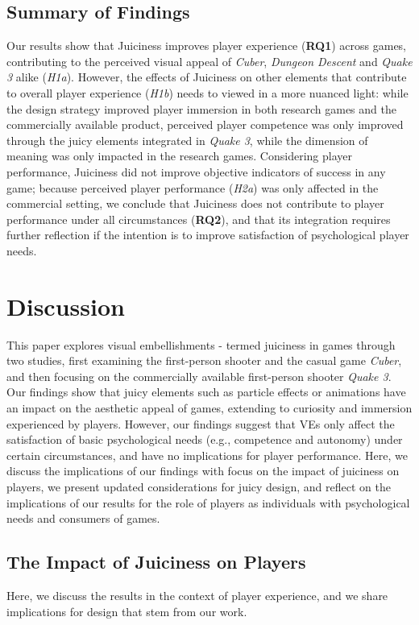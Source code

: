 \documentclass{sigchi}
\begin{document}
\subsection{Summary of Findings}
Our results show that Juiciness improves player experience (\textbf{RQ1}) across games, contributing to the perceived visual appeal of \textit{Cuber}, \textit{Dungeon Descent} and \textit{Quake 3} alike (\textit{H1a}). However, the effects of Juiciness on other elements that contribute to overall player experience (\textit{H1b}) needs to viewed in a more nuanced light: while the design strategy improved player immersion in both research games and the commercially available product, perceived player competence was only improved through the juicy elements integrated in \textit{Quake 3}, while the dimension of meaning was only impacted in the research games. Considering player performance, Juiciness did not improve objective indicators of success in any game; because perceived player performance (\textit{H2a}) was only affected in the commercial setting, we conclude that Juiciness does not contribute to player performance under all circumstances (\textbf{RQ2}), and that its integration requires further reflection if the intention is to improve satisfaction of psychological player needs.
\section{Discussion}
This paper explores visual embellishments - termed juiciness in games through two studies, first examining the first-person shooter  and the casual game \textit{Cuber}, and then focusing on the commercially available first-person shooter \textit{Quake 3}. Our findings show that juicy elements such as particle effects or animations have an impact on the aesthetic appeal of games, extending to curiosity and immersion experienced by players. However, our findings suggest that VEs only affect the satisfaction of basic psychological needs (e.g., competence and autonomy) under certain circumstances, and have no implications for player performance. Here, we discuss the implications of our findings with focus on the impact of juiciness on players, we present updated considerations for juicy design, and reflect on the implications of our results for the role of players as individuals with psychological needs and consumers of games.

\subsection{The Impact of Juiciness on Players}
Here, we discuss the results in the context of player experience, and we share implications for design that stem from our work.
\end{document}
